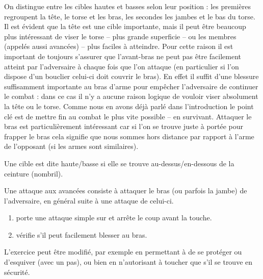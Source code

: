 On distingue entre les cibles hautes et basses selon leur position : les premières regroupent la tête, le torse et les bras, les secondes les jambes et le bas du torse.
Il est évident que la tête est une cible importante, mais il peut être beaucoup plus intéressant de viser le torse -- plus grande superficie -- ou les membres (appelés aussi avancées) -- plus faciles à atteindre.
Pour cette raison il est important de toujours s'assurer que l'avant-bras ne peut pas être facilement atteint par l'adversaire à chaque fois que l'on attaque (en particulier si l'on dispose d'un bouclier celui-ci doit couvrir le bras).
En effet il suffit d'une blessure suffisamment importante au bras d'arme pour empêcher l'adversaire de continuer le combat : dans ce cas il n'y a aucune raison logique de vouloir viser absolument la tête ou le torse.
Comme nous en avons déjà parlé dans l'introduction le point clé est de mettre fin au combat le plus vite possible -- en survivant.
Attaquer le bras est particulièrement intéressant car si l'on se trouve juste à portée pour frapper le bras cela signifie que nous sommes hors distance par rapport à l'arme de l'opposant (si les armes sont similaires).


\begin{definition}

Une cible est dite haute/basse si elle se trouve au-dessus/en-dessous de la ceinture (nombril).
\end{definition}


\begin{coup}

Une attaque aux avancées consiste à attaquer le bras (ou parfois la jambe) de l'adversaire, en général suite à une attaque de celui-ci.

\end{coup}


\begin{exercice}

\begin{enumerate}
	\item \A porte une attaque simple sur \D et arrête le coup avant la touche.
	
	\item \D vérifie s'il peut facilement blesser \A au bras.
\end{enumerate}

L'exercice peut être modifié, par exemple en permettant à \D de se protéger ou d'esquiver (avec un pas), ou bien en n'autorisant \D à toucher \A que s'il se trouve en sécurité.

\end{exercice}


